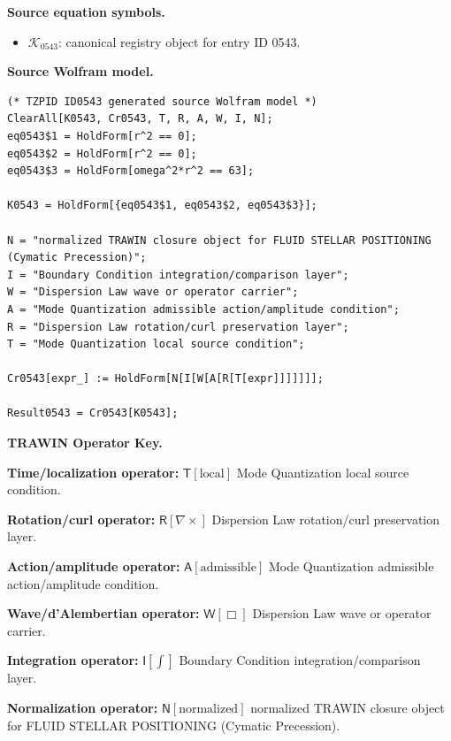\begin{minipage}[t]{0.49\linewidth}
\begingroup
\small
\raggedright
\textbf{Source equation symbols.}\par
\begin{itemize}[leftmargin=1.35em,itemsep=1pt,topsep=1pt,parsep=0pt]
    \item $\mathcal{K}_{0543}$: canonical registry object for entry ID 0543.
\end{itemize}
\endgroup
\end{minipage}\hfill
\begin{minipage}[t]{0.47\linewidth}
\begingroup
\scriptsize
\raggedright
\textbf{Source Wolfram model.}\par
\begin{Verbatim}[fontsize=\tiny,breaklines=true,breakanywhere=true]
(* TZPID ID0543 generated source Wolfram model *)
ClearAll[K0543, Cr0543, T, R, A, W, I, N];
eq0543$1 = HoldForm[r^2 == 0];
eq0543$2 = HoldForm[r^2 == 0];
eq0543$3 = HoldForm[omega^2*r^2 == 63];

K0543 = HoldForm[{eq0543$1, eq0543$2, eq0543$3}];

N = "normalized TRAWIN closure object for FLUID STELLAR POSITIONING (Cymatic Precession)";
I = "Boundary Condition integration/comparison layer";
W = "Dispersion Law wave or operator carrier";
A = "Mode Quantization admissible action/amplitude condition";
R = "Dispersion Law rotation/curl preservation layer";
T = "Mode Quantization local source condition";

Cr0543[expr_] := HoldForm[N[I[W[A[R[T[expr]]]]]]];

Result0543 = Cr0543[K0543];
\end{Verbatim}
\endgroup
\end{minipage}

\par\vspace{0.45\baselineskip}
\noindent\begin{minipage}[t]{\linewidth}
\begingroup
\small
\raggedright
\textbf{TRAWIN Operator Key.}\par
\noindent\textbf{Time/localization operator:} $\mathsf{T}\!\left[\mathrm{local}\right]$ Mode Quantization local source condition.\par
\noindent\textbf{Rotation/curl operator:} $\mathsf{R}\!\left[\nabla\times\right]$ Dispersion Law rotation/curl preservation layer.\par
\noindent\textbf{Action/amplitude operator:} $\mathsf{A}\!\left[\mathrm{admissible}\right]$ Mode Quantization admissible action/amplitude condition.\par
\noindent\textbf{Wave/d'Alembertian operator:} $\mathsf{W}\!\left[\Box\right]$ Dispersion Law wave or operator carrier.\par
\noindent\textbf{Integration operator:} $\mathsf{I}\!\left[\int\right]$ Boundary Condition integration/comparison layer.\par
\noindent\textbf{Normalization operator:} $\mathsf{N}\!\left[\mathrm{normalized}\right]$ normalized TRAWIN closure object for FLUID STELLAR POSITIONING (Cymatic Precession).\par
\endgroup
\end{minipage}

